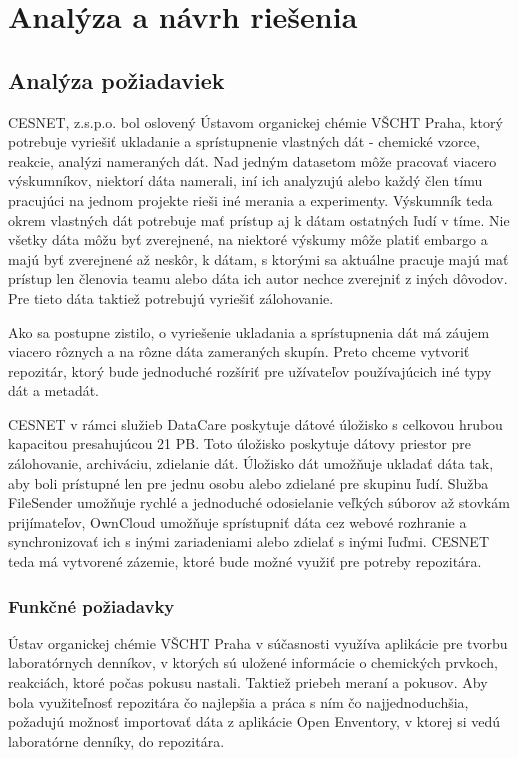\documentclass[thesis=M,slovak]{FITthesis}[2013/05/06]
\begin{document}
\chapter{Analýza a návrh riešenia}
\section{Analýza požiadaviek}
CESNET, z.s.p.o. bol oslovený Ústavom organickej chémie VŠCHT Praha, ktorý potrebuje vyriešiť ukladanie a sprístupnenie vlastných dát - chemické vzorce, reakcie, analýzi nameraných dát. Nad jedným datasetom môže pracovať viacero výskumníkov, niektorí dáta namerali, iní ich analyzujú alebo každý člen tímu pracujúci na jednom projekte rieši iné merania a experimenty. Výskumník teda okrem vlastných dát potrebuje mať prístup aj k dátam ostatných ľudí v tíme. Nie všetky dáta môžu byť zverejnené, na niektoré výskumy môže platiť embargo a majú byť zverejnené až neskôr, k dátam, s ktorými sa aktuálne pracuje majú mať prístup len členovia teamu alebo dáta ich autor nechce zverejniť z iných dôvodov. Pre tieto dáta taktiež potrebujú vyriešiť zálohovanie.

Ako sa postupne zistilo, o vyriešenie ukladania a sprístupnenia dát má záujem viacero rôznych a na rôzne dáta zameraných skupín. Preto chceme vytvoriť repozitár, ktorý bude jednoduché rozšíriť pre užívateľov používajúcich iné typy dát a metadát.

CESNET v rámci služieb DataCare poskytuje dátové úložisko s celkovou hrubou kapacitou presahujúcou 21 PB. Toto úložisko poskytuje dátovy priestor pre zálohovanie, archiváciu, zdielanie dát. \cite{DataCare} Úložisko dát umožňuje ukladať dáta tak, aby boli prístupné len pre jednu osobu alebo zdielané pre skupinu ľudí. Služba FileSender umožňuje rychlé a jednoduché odosielanie veľkých súborov až stovkám prijímateľov, OwnCloud umožňuje sprístupniť dáta cez webové rozhranie a synchronizovať ich s inými zariadeniami alebo zdielať s inými ľuďmi. \cite {DatoveUloziste} CESNET teda má vytvorené zázemie, ktoré bude možné využiť pre potreby repozitára.

\subsection{Funkčné požiadavky}

Ústav organickej chémie VŠCHT Praha v súčasnosti využíva aplikácie pre tvorbu laboratórnych denníkov, v ktorých sú uložené informácie o chemických prvkoch, reakciách, ktoré počas pokusu nastali. Taktiež priebeh meraní a pokusov. Aby bola využiteľnosť repozitára čo najlepšia a práca s ním čo najjednoduchšia, požadujú možnosť importovať dáta z aplikácie Open Enventory, v ktorej si vedú laboratórne denníky, do repozitára. 
\end{document}
